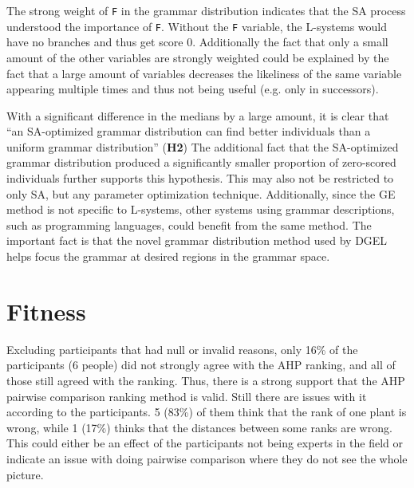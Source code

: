 The strong weight of \texttt{F} in the grammar distribution indicates that the \gls{SA} process understood the importance of \texttt{F}.
Without the \texttt{F} variable, the \glspl{L-system} would have no branches and thus get score 0.
Additionally the fact that only a small amount of the other variables are strongly weighted could be explained by the fact that a large amount of variables decreases the likeliness of the same variable appearing multiple times and thus not being useful (e.g. only in successors).

With a significant difference in the medians by a large amount, it is clear that ``an \gls{SA}-optimized grammar distribution can find better individuals than a uniform grammar distribution'' (\textbf{H2})
The additional fact that the \gls{SA}-optimized grammar distribution produced a significantly smaller proportion of zero-scored individuals further supports this hypothesis.
This may also not be restricted to only \gls{SA}, but any parameter optimization technique.
Additionally, since the \gls{GE} method is not specific to \glspl{L-system}, other systems using grammar descriptions, such as programming languages, could benefit from the same method.
The important fact is that the novel grammar distribution method used by \gls{DGEL} helps focus the grammar at desired regions in the grammar space.


\section{Fitness}
Excluding participants that had null or invalid reasons, only 16\% of the participants (6 people) did not strongly agree with the AHP ranking, and all of those still agreed with the ranking.
Thus, there is a strong support that the AHP pairwise comparison ranking method is valid.
Still there are issues with it according to the participants.
5 (83\%) of them think that the rank of one plant is wrong, while 1 (17\%) thinks that the distances between some ranks are wrong.
This could either be an effect of the participants not being experts in the field or indicate an issue with doing pairwise comparison where they do not see the whole picture.

